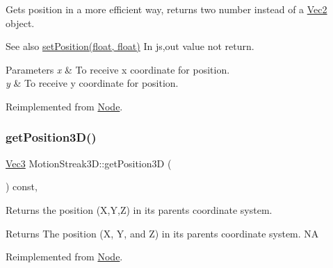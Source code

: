 Gets position in a more efficient way, returns two number instead of a \hyperlink{classVec2}{Vec2} object.

\begin{DoxySeeAlso}{See also}
{\ttfamily \hyperlink{classMotionStreak3D_ada67cecb8a81f0f48615d24eb9fc2373}{set\+Position(float, float)}} In js,out value not return.
\end{DoxySeeAlso}

\begin{DoxyParams}{Parameters}
{\em x} & To receive x coordinate for position. \\
\hline
{\em y} & To receive y coordinate for position. \\
\hline
\end{DoxyParams}


Reimplemented from \hyperlink{classNode_a216f30e9a2dda896b2ffff1885b33a98}{Node}.

\mbox{\label{classMotionStreak3D_a60ec5113c30e2b81c15b43595a98ce63}} 
\subsubsection{\texorpdfstring{get\+Position3\+D()}{getPosition3D()}\hspace{0.1cm}{\footnotesize\ttfamily [1/2]}}
{\footnotesize\ttfamily \hyperlink{classVec3}{Vec3} Motion\+Streak3\+D\+::get\+Position3D (\begin{DoxyParamCaption}{ }\end{DoxyParamCaption}) const\hspace{0.3cm}{\ttfamily [override]}, {\ttfamily [virtual]}}

Returns the position (X,Y,Z) in its parent\textquotesingle{}s coordinate system.

\begin{DoxyReturn}{Returns}
The position (X, Y, and Z) in its parent\textquotesingle{}s coordinate system.  NA 
\end{DoxyReturn}


Reimplemented from \hyperlink{classNode_a8617dd2eb9af75a66ebaff0d3c99285e}{Node}.

\mbox{\label{classMotionStreak3D_ab2c89d13a16dc7ee2e8f2408a1f5afbb}} 
